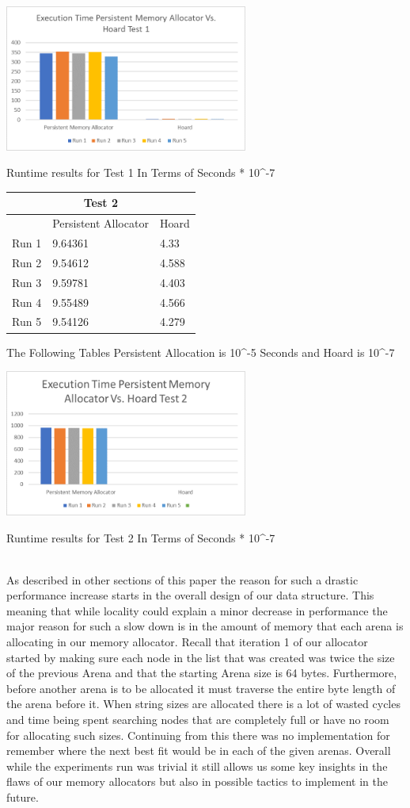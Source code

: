 \documentclass[conference]{IEEEtran}
\begin{document}
\includegraphics[width=8cm]{llllllllll.png}
\caption{Runtime results for Test 1 In Terms of Seconds * 10^-7}
\label{fig4:Test 1}

\begin{tabular}{ |p{1cm}||p{3cm}|p{3cm}|  }
 \hline
 \multicolumn{3}{|c|}{Test 2} \\
 \hline
 & Persistent Allocator & Hoard \\
 \hline
 Run 1   &9.64361    & 4.33\\
 Run 2& 9.54612    &  4.588  \\
 Run 3 &9.59781 &  4.403 \\
 Run 4&9.55489 & 4.566\\
 Run 5&  9.54126  & 4.279\\
 \hline
\end{tabular}
 The Following Tables Persistent Allocation is 10^-5 Seconds and Hoard is 10^-7


\includegraphics[width=8cm]{lll.png}
\caption{Runtime results for Test 2 In Terms of Seconds * 10^-7}
\label{fig4:Test 1}
\\


As described in other sections of this paper the reason for such a drastic performance increase starts in the overall design of our data structure. This meaning that while locality could explain a minor decrease in performance the major reason for such a slow down is in the amount of memory that each arena is allocating in our memory allocator. Recall that iteration 1 of our allocator started by making sure each node in the list that was created was twice the size of the previous Arena and that the starting Arena size is 64 bytes. Furthermore, before another arena is to be allocated it must traverse the entire byte length of the arena before it. When string sizes are allocated there is a lot of wasted cycles and time being spent searching nodes that are completely full or have no room for allocating such sizes. Continuing from this there was no implementation for remember where the next best fit would be in each of the given arenas. Overall while the experiments run was trivial it still allows us some key insights in the flaws of our memory allocators but also in possible tactics to implement in the future. 
\end{document}
